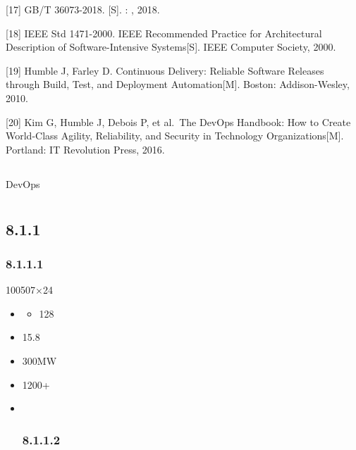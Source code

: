 {[}17{]} GB/T 36073-2018. {[}S{]}. : , 2018.

{[}18{]} IEEE Std 1471-2000. IEEE Recommended Practice for Architectural
Description of Software-Intensive Systems{[}S{]}. IEEE Computer Society,
2000.

{[}19{]} Humble J, Farley D. Continuous Delivery: Reliable Software
Releases through Build, Test, and Deployment Automation{[}M{]}. Boston:
Addison-Wesley, 2010.

{[}20{]} Kim G, Humble J, Debois P, et al.~The DevOps Handbook: How to
Create World-Class Agility, Reliability, and Security in Technology
Organizations{[}M{]}. Portland: IT Revolution Press, 2016.

\hypertarget{section-27}{%
\subsection{}\label{section-27}}

DevOps

\hypertarget{section-28}{%
\section{}\label{section-28}}

\hypertarget{section-29}{%
\subsection{8.1.1}\label{section-29}}

\hypertarget{section-30}{%
\subsubsection{8.1.1.1}\label{section-30}}

100507×24

\important{}

\begin{itemize}
\item
  \begin{itemize}
  \tightlist
  \item
    128
  \end{itemize}
\item
  15.8
\item
  300MW
\item
  1200+
\item ~
  \hypertarget{section-31}{%
  \subsubsection{8.1.1.2}\label{section-31}}
\end{itemize}


